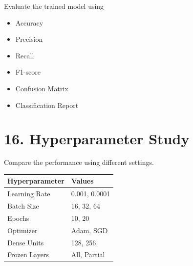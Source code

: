 \documentclass[11pt]{article}
\begin{document}
Evaluate the trained model using

\begin{itemize}

\item Accuracy

\item Precision

\item Recall

\item F1-score

\item Confusion Matrix

\item Classification Report

\end{itemize}


\section*{16. Hyperparameter Study}

Compare the performance using different settings.

\begin{center}

\begin{tabular}{|l|l|}

\hline

Hyperparameter & Values\\

\hline

Learning Rate &
0.001, 0.0001\\

\hline

Batch Size &
16, 32, 64\\

\hline

Epochs &
10, 20\\

\hline

Optimizer &
Adam, SGD\\

\hline

Dense Units &
128, 256\\

\hline

Frozen Layers &
All, Partial\\

\hline

\end{tabular}

\end{center}
\end{document}
